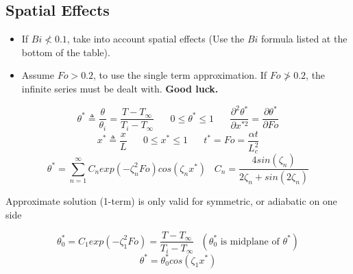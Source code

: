 \documentclass[twocolumn, 12pt]{article}
\begin{document}
\subsection*{Spatial Effects}
\begin{itemize}
    \item If \(Bi \nless 0.1\), take into account spatial effects (Use the \(Bi\) formula listed at the bottom of the table). 
    \item Assume \(Fo > 0.2\), to use the single term approximation. If \(Fo \ngtr 0.2\), the infinite series must be dealt with. \textbf{Good luck.}
\end{itemize}
    \begin{equation*}
        \theta^* \triangleq \frac{\theta}{\theta_i} = \frac{T-T_\infty}{T_i-T_\infty} \hspace{20pt} 0\leq \theta^* \leq 1 \hspace{20pt} \frac{\partial^2 \theta^*}{\partial x^{*2}} = \frac{\partial \theta^*}{\partial Fo}
    \end{equation*}
    \begin{equation*}
        x^*\triangleq \frac{x}{L} \hspace{20pt} 0\leq x^* \leq 1 \hspace{20pt} t^* = Fo =\frac{\alpha t}{L_c^2}
    \end{equation*}
    \begin{equation*}
        \theta^* = \sum_{n=1}^\infty C_n exp(-\zeta_n^2 Fo)cos(\zeta_n x^*) \hspace{10pt} C_n = \frac{4sin(\zeta_n)}{2\zeta_n + sin(2\zeta_n)}
    \end{equation*}
    \begin{center}
        Approximate solution (1-term) is only valid for symmetric, or adiabatic on one side
    \end{center}
    \begin{equation*}
        \theta_0^* = C_1 exp (-\zeta^2_1 Fo) = \frac{T-T_\infty}{T_i-T_\infty} \hspace{8pt} (\theta_0^* \text{  is midplane of }\theta^*)
    \end{equation*}
    \begin{equation*}
        \theta^* = \theta_0^* cos(\zeta_1 x^*)
    \end{equation*}
    
    
\end{document}
